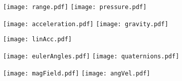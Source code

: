 \documentclass{article}
\begin{document}
\begin{figure}[h!]
\begin{multicols}{2}
    \texttt{[image: range.pdf]}
        \texttt{[image: pressure.pdf]}
\end{multicols}

\begin{multicols}{2}
    \texttt{[image: acceleration.pdf]}
    \texttt{[image: gravity.pdf]}
\end{multicols}

\texttt{[image: linAcc.pdf]}

\end{figure}

\newpage
\begin{figure}[h!]

\begin{multicols}{2}
    \texttt{[image: eulerAngles.pdf]}
    \texttt{[image: quaternions.pdf]}
\end{multicols}

\begin{multicols}{2}
    \texttt{[image: magField.pdf]}
    \texttt{[image: angVel.pdf]}
\end{multicols}



\end{figure}
\end{document}
